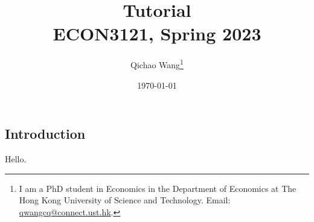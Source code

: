\documentclass[12pt, a4paper]{article}
\title{Tutorial \\ ECON3121, Spring 2023}
\author{\large Qichao Wang\thanks{I am a PhD student in Economics in the Department of Economics at The Hong Kong University of Science and Technology. Email: \href{mailto:qwangcq@connect.ust.hk}{qwangcq@connect.ust.hk}.}}
\date{\today}
\begin{document}
\maketitle

\begin{onehalfspace}

\setlength{\abovedisplayskip}{3pt}
\setlength{\belowdisplayskip}{3pt}

\section{Introduction}

Hello.


\end{onehalfspace}

\end{document}
